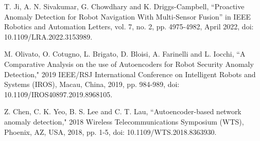 \documentclass[12]{article}
\begin{document}
\begin{thebibliography}{9}
T. Ji, A. N. Sivakumar, G. Chowdhary and K. Driggs-Campbell, ``Proactive Anomaly Detection for Robot Navigation With Multi-Sensor Fusion'' in IEEE Robotics and Automation Letters, vol. 7, no. 2, pp. 4975-4982, April 2022, doi: 10.1109/LRA.2022.3153989.

M. Olivato, O. Cotugno, L. Brigato, D. Bloisi, A. Farinelli and L. Iocchi, ``A Comparative Analysis on the use of Autoencoders for Robot Security Anomaly Detection," 2019 IEEE/RSJ International Conference on Intelligent Robots and Systems (IROS), Macau, China, 2019, pp. 984-989, doi: 10.1109/IROS40897.2019.8968105.


 Z. Chen, C. K. Yeo, B. S. Lee and C. T. Lau, ``Autoencoder-based network anomaly detection," 2018 Wireless Telecommunications Symposium (WTS), Phoenix, AZ, USA, 2018, pp. 1-5, doi: 10.1109/WTS.2018.8363930.

\end{thebibliography}
\end{document}
